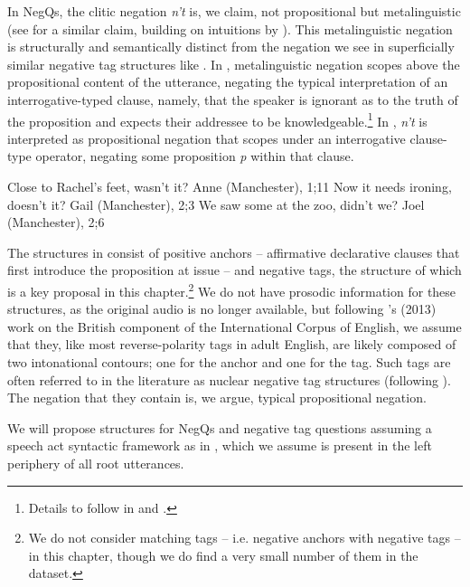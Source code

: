 \documentclass[output=paper,colorlinks,citecolor=brown]{langscibook}
\begin{document}
In NegQs, the clitic negation \textit{n't} is, we claim, not propositional but metalinguistic (see \citealt{goodhue2022allc, goodhue2022nls} for a similar claim, building on intuitions by \citealt{ladd1981}). This metalinguistic negation is structurally and semantically distinct from the negation we see in superficially similar negative tag structures like . In , metalinguistic negation scopes above the propositional content of the utterance, negating the typical interpretation of an interrogative-typed clause, namely, that the speaker is ignorant as to the truth of the proposition and expects their addressee to be knowledgeable.\footnote{Details to follow in  and .}  In , \textit{n't} is interpreted as propositional negation that scopes under an interrogative clause-type operator, negating some proposition \textit{p} within that clause. 

\ea \label{intro:tagqs}
	\ea Close to Rachel's feet, wasn't it? \label{intro:tagqa} \phantom{a} \hfill Anne (Manchester), 1;11
	\ex Now it needs ironing, doesn't it? \phantom{a} \hfill Gail (Manchester), 2;3
	\ex We saw some at the zoo, didn't we?\phantom{a} \hfill Joel (Manchester), 2;6
 \z
\z


The structures in  consist of positive anchors -- affirmative declarative clauses that first introduce the proposition at issue -- and negative tags, the structure of which is a key proposal in this chapter.\footnote{We do not consider matching tags -- i.e. negative anchors with negative tags -- in this chapter, though we do find a very small number of them in the dataset.} We do not have prosodic information for these structures, as the original audio is no longer available, but following \citeauthor{dehebraun2013}'s (2013) work on the British component of the International Corpus of English, we assume that they, like most reverse-polarity tags in adult English, are likely composed of two intonational contours; one for the anchor and one for the tag. Such tags are often referred to in the literature as nuclear negative tag structures (following \citealt{ladd1981}). The negation that they contain is, we argue, typical propositional negation.

We will propose structures for NegQs and negative tag questions assuming a speech act syntactic framework as in , which we assume is present in the left periphery of all root utterances.
\end{document}
